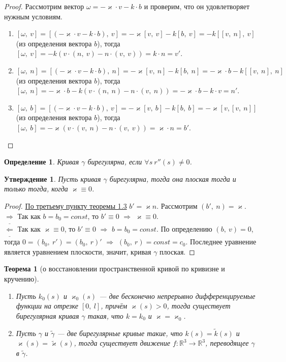 \documentclass[12pt]{article}
\newcommand\tab[1][.5cm]{\hspace*{#1}}
\theoremstyle{plain}
\newtheorem{theorem}{Теорема}[section]
\newtheorem{subtheorem}{Утверждение}[section]
\newtheorem{definition}{Определение}[section]
\newcommand{\R}{\mathbb R}
\begin{document}
    \begin{proof}
        Рассмотрим вектор $\omega=-\varkappa\cdot v-k\cdot b$ и проверим, что он удовлетворяет нужным условиям.
        \begin{enumerate}
            \item $[\omega, \ v]=[(-\varkappa\cdot v-k\cdot b), \ v]=-\varkappa[v, \ v]-k[b, \ v]=-k[[v, \ n], \ v]$ (из определения вектора $b$), тогда $[\omega, \ v]=-k(v\cdot(n, \ v)-n\cdot(v, \ v))=k\cdot n=v'$.
            \item $[\omega, \ n]=[(-\varkappa\cdot v-k\cdot b), \ n]=-\varkappa[v, \ n]-k[b, \ n]=-\varkappa\cdot b-k[[v, \ n], \ n]$ (из определения вектора $b$), тогда $[\omega, \ n]=-\varkappa\cdot b-k(v\cdot(n, \ n)-n\cdot(v, \ n))=-\varkappa\cdot b-k\cdot v=n'$.
            \item $[\omega, \ b]=[(-\varkappa\cdot v-k\cdot b), \ v]=-\varkappa[v, \ b]-k[b, \ b]=-\varkappa[v, [v, \ n]]$ (из определения вектора $b$), тогда $[\omega, \ b]=-\varkappa(v\cdot(v, \ n)-n\cdot(v, \ v))=\varkappa\cdot n=b'$.
        \end{enumerate}
    \end{proof}
    \begin{definition}
        Кривая $\gamma$ бирегулярна, если $\forall s \ r''(s)\neq0$.
    \end{definition}
    \begin{subtheorem}
        Пусть кривая $\gamma$ бирегулярна, тогда она плоская тогда и только тогда, когда $\varkappa\equiv0$.
    \end{subtheorem}
    \begin{proof}
        \hyperlink{4}{По третьему пункту теоремы 1.3} $b'=\varkappa n$. Рассмотрим $(b', \ n)=\varkappa$.\\$\underline{\Longrightarrow}$ Так как $b=b_0=const$, то $b'\equiv0$ $\Longrightarrow$ $\varkappa\equiv0$.\\
        $\underline{\Longleftarrow}$ Так как $\varkappa\equiv0$, то $b'\equiv0$ $\Longrightarrow$ $b=b_0=const$. По определению $(b, \ v)=0$, тогда $0=(b_0, \ r')=(b_0, \ r)'$ $\Longrightarrow$ $(b_0, \ r)=const=c_0$.  Последнее уравнение является уравнением плоскости, значит, кривая $\gamma$ плоская.
    \end{proof}
    \begin{theorem}[о восстановлении пространственной кривой по кривизне и кручению]\tab
        \begin{enumerate}
            \item Пусть $k_0(s)$ и $\varkappa_0(s)$ --- две бесконечно непрерывно дифференцируемые функции на отрезке $[0, \ l]$, причём $\varkappa(s)>0$, тогда существует бирегулярная кривая $\gamma$ такая, что $k=k_0$ и $\varkappa=\varkappa_0$.
            \item Пусть $\gamma$ и $\tilde{\gamma}$ --- две бирегулярные кривые такие, что $k(s)=\tilde{k}(s)$ и $\varkappa(s)=\tilde{\varkappa}(s)$, тогда существует движение $f:\R^3\to\R^3$, переводящее $\gamma$ в $\tilde{\gamma}$.
        \end{enumerate}
    \end{theorem}
\end{document}
